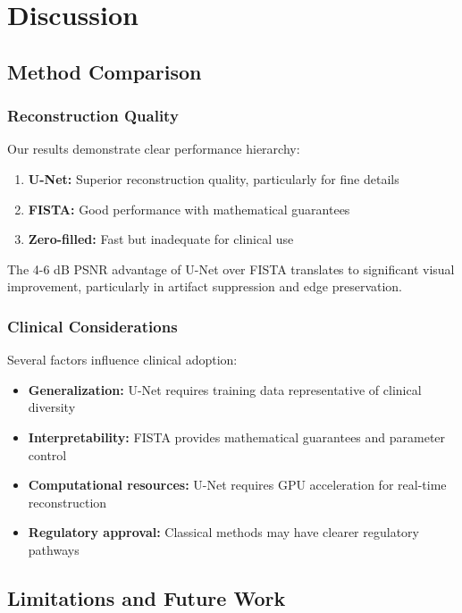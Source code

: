 \documentclass[11pt,a4paper]{article}
\begin{document}
\section{Discussion}

\subsection{Method Comparison}

\subsubsection{Reconstruction Quality}

Our results demonstrate clear performance hierarchy:

\begin{enumerate}
    \item \textbf{U-Net:} Superior reconstruction quality, particularly for fine details
    \item \textbf{FISTA:} Good performance with mathematical guarantees
    \item \textbf{Zero-filled:} Fast but inadequate for clinical use
\end{enumerate}

The 4-6 dB PSNR advantage of U-Net over FISTA translates to significant visual improvement, particularly in artifact suppression and edge preservation.

\subsubsection{Clinical Considerations}

Several factors influence clinical adoption:

\begin{itemize}
    \item \textbf{Generalization:} U-Net requires training data representative of clinical diversity
    \item \textbf{Interpretability:} FISTA provides mathematical guarantees and parameter control
    \item \textbf{Computational resources:} U-Net requires GPU acceleration for real-time reconstruction
    \item \textbf{Regulatory approval:} Classical methods may have clearer regulatory pathways
\end{itemize}

\subsection{Limitations and Future Work}
\end{document}
